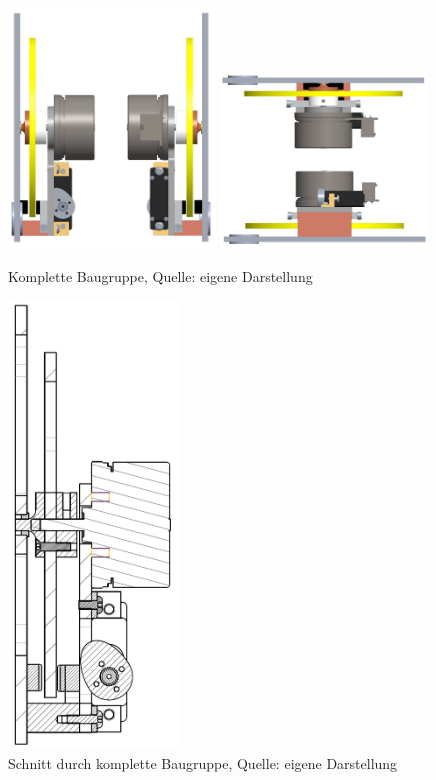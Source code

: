 \begin{figure}[h!]
	\includegraphics[width=0.49\textwidth]{img/1d_assembled_side}
	\includegraphics[width=0.49\textwidth]{img/1d_assembled_front_back}
	\caption{Komplette Baugruppe, Quelle: eigene Darstellung} 
	\end{figure} 

	\begin{figure}[h!]
	\begin{center}
	\includegraphics[width=0.4\textwidth,angle=90]{img/1d_assembled_schnitt}
	\end{center}
	\caption{Schnitt durch komplette Baugruppe, Quelle: eigene Darstellung}
	\end{figure} 
 

		
